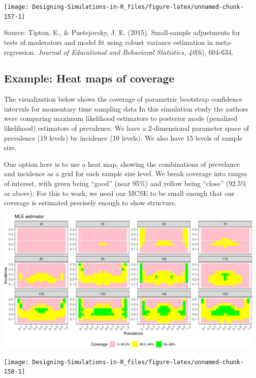 \documentclass[
]{book}
\begin{document}
\begin{center}\texttt{[image: Designing-Simulations-in-R\_files/figure-latex/unnamed-chunk-157-1]} \end{center}

Source: Tipton, E., \& Pustejovsky, J. E. (2015). Small-sample adjustments for tests of moderators and model fit using robust variance estimation in meta-regression. \emph{Journal of Educational and Behavioral Statistics, 40}(6), 604-634.

\hypertarget{example-heat-maps-of-coverage}{%
\subsection{Example: Heat maps of coverage}\label{example-heat-maps-of-coverage}}

The visualization below shows the coverage of parametric bootstrap confidence intervals for momentary time sampling data
In this simulation study the authors were comparing maximum likelihood estimators to posterior mode (penalized likelihood) estimators of prevalence.
We have a 2-dimensional parameter space of prevalence (19 levels) by incidence (10 levels).
We also have 15 levels of sample size.

One option here is to use a heat map, showing the combinations of prevelance and incidence as a grid for each sample size level.
We break coverage into ranges of interest, with green being ``good'' (near 95\%) and yellow being ``close'' (92.5\% or above).
For this to work, we need our MCSE to be small enough that our coverage is estimated precisely enough to show structure.

\begin{center}\includegraphics[width=0.75\linewidth]{Designing-Simulations-in-R_files/figure-latex/swan_example_setup-1} \end{center}

\begin{center}\texttt{[image: Designing-Simulations-in-R\_files/figure-latex/unnamed-chunk-158-1]} \end{center}
\end{document}
